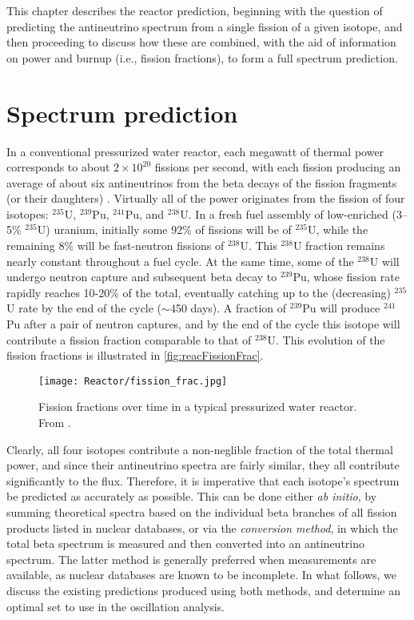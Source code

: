 \documentclass[../thesis.tex]{subfiles}
\begin{document}
This chapter describes the reactor prediction, beginning with the question of predicting the antineutrino spectrum from a single fission of a given isotope, and then proceeding to discuss how these are combined, with the aid of information on power and burnup (i.e., fission fractions), to form a full spectrum prediction.

\section{Spectrum prediction}
\label{sec:specpred}

\def\urfive{$^{235}$U\xspace} \def\punine{$^{239}$Pu\xspace}
\def\puone{$^{241}$Pu\xspace} \def\ureight{$^{238}$U\xspace}

In a conventional pressurized water reactor, each megawatt of thermal power corresponds to about $2\times10^{20}$ fissions per second, with each fission producing an average of about six antineutrinos from the beta decays of the fission fragments (or their daughters) \cite{PhysRevC.84.024617}. Virtually all of the power originates from the fission of four isotopes: \urfive, \punine, \puone, and \ureight. In a fresh fuel assembly of low-enriched (3--5\% $^{235}$U) uranium, initially some 92\% of fissions will be of \urfive, while the remaining 8\% will be fast-neutron fissions of \ureight. This \ureight fraction remains nearly constant throughout a fuel cycle. At the same time, some of the \ureight will undergo neutron capture and subsequent beta decay to \punine, whose fission rate rapidly reaches 10-20\% of the total, eventually catching up to the (decreasing) \urfive rate by the end of the cycle ($\sim$450 days). A fraction of \punine will produce \puone after a pair of neutron captures, and by the end of the cycle this isotope will contribute a fission fraction comparable to that of \ureight. This evolution of the fission fractions is illustrated in \autoref{fig:reacFissionFrac}.

\begin{figure}[ht]
  \texttt{[image: Reactor/fission\_frac.jpg]}
  \caption{Fission fractions over time in a typical pressurized water reactor. From \cite{spectrum2017}.}
  \label{fig:reacFissionFrac}
\end{figure}

Clearly, all four isotopes contribute a non-neglible fraction of the total thermal power, and since their antineutrino spectra are fairly similar, they all contribute significantly to the flux. Therefore, it is imperative that each isotope's spectrum be predicted as accurately as possible. This can be done either \emph{ab initio}, by summing theoretical spectra based on the individual beta branches of all fission products listed in nuclear databases, or via the \emph{conversion method}, in which the total beta spectrum is measured and then converted into an antineutrino spectrum. The latter method is generally preferred when measurements are available, as nuclear databases are known to be incomplete. In what follows, we discuss the existing predictions produced using both methods, and determine an optimal set to use in the oscillation analysis.
\end{document}
